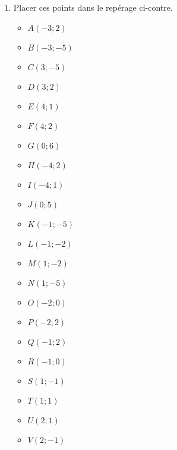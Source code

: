 \begin{enigme}[Déformations]
    \partie[dessin]
       \begin{minipage}{10cm}
          \begin{enumerate}
             \item Placer ces points dans le repérage ci-contre. \\ [-9mm]
                \begin{multicols}{4}
                    \begin{itemize}
                        \item[]$A(-3;2)$
                        \item[] $B(-3;-5)$
                        \item[] $C(3;-5)$
                        \item[] $D(3;2)$
                        \item[] $E(4;1)$
                        \item[] $F(4;2)$
                        \item[] $G(0;6)$
                        \item[] $H(-4;2)$
                        \item[] $I(-4;1)$
                        \item[] $J(0;5)$
                        \item[] $K(-1;-5)$
                        \item[] $L(-1;-2)$
                        \item[] $M(1;-2)$
                        \item[] $N(1;-5)$
                        \item[] $O(-2;0)$
                        \item[] $P(-2;2)$
                        \item[] $Q(-1;2)$
                        \item[] $R(-1;0)$
                        \item[] $S(1;-1)$
                        \item[] $T(1;1)$
                        \item[] $U(2;1)$
                        \item[] $V(2;-1)$
                    \end{itemize}
                \end{multicols}

\end{enumerate}
\end{minipage}
\end{enigme}
